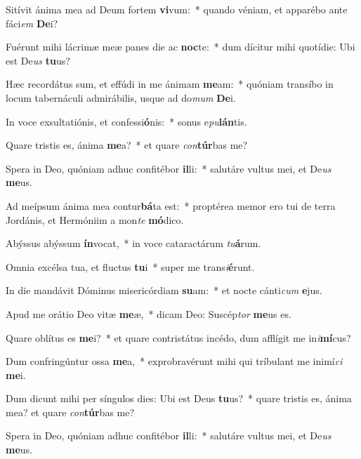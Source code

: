\item Sitívit ánima mea ad Deum fortem \textbf{vi}vum:~* quando véniam, et apparébo ante fáci\textit{em} \textbf{De}i?
\item Fuérunt mihi lácrimæ meæ panes die ac \textbf{noc}te:~* dum dícitur mihi quotídie: Ubi est De\textit{us} \textbf{tu}us?
\item Hæc recordátus sum, et effúdi in me ánimam \textbf{me}am:~* quóniam transíbo in locum tabernáculi admirábilis, usque ad do\textit{mum} \textbf{De}i.
\item In voce exsultatiónis, et confessi\textbf{ó}nis:~* sonus e\textit{pu}\textbf{lán}tis.
\item Quare tristis es, ánima \textbf{me}a?~* et quare \textit{con}\textbf{túr}bas me?
\item Spera in Deo, quóniam adhuc confitébor \textbf{il}li:~* salutáre vultus mei, et De\textit{us} \textbf{me}us.
\item Ad meípsum ánima mea contur\textbf{bá}ta est:~* proptérea memor ero tui de terra Jordánis, et Hermóniim a mon\textit{te} \textbf{mó}dico.
\item Abýssus abýssum \textbf{ín}vocat,~* in voce cataractárum \textit{tu}\textbf{á}rum.
\item Omnia excélsa tua, et fluctus \textbf{tu}i~* super me trans\textit{i}\textbf{é}runt.
\item In die mandávit Dóminus misericórdiam \textbf{su}am:~* et nocte cánti\textit{cum} \textbf{e}jus.
\item Apud me orátio Deo vitæ \textbf{me}æ,~* dicam Deo: Suscép\textit{tor} \textbf{me}us es.
\item Quare oblítus es \textbf{me}i?~* et quare contristátus incédo, dum afflígit me in\textit{i}\textbf{mí}cus?
\item Dum confringúntur ossa \textbf{me}a,~* exprobravérunt mihi qui tríbulant me inimí\textit{ci} \textbf{me}i.
\item Dum dicunt mihi per síngulos dies: Ubi est Deus \textbf{tu}us?~* quare tristis es, ánima mea? et quare \textit{con}\textbf{túr}bas me?
\item Spera in Deo, quóniam adhuc confitébor \textbf{il}li:~* salutáre vultus mei, et De\textit{us} \textbf{me}us.
